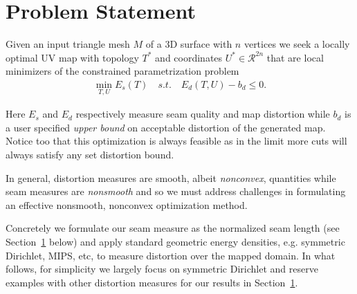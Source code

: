 
\section{Problem Statement}

Given an input triangle mesh $M$ of a 3D surface with $n$ vertices we seek a locally optimal UV map with topology $T^*$ and coordinates $U^* \in \mathcal{R}^{2n}$ that are local minimizers of the constrained parametrization problem
\begin{align}
	\min_{T,U} E_s(T) \quad s.t. \quad E_d(T,U) - b_d \leq 0.
	\label{eq:p1}
\end{align}


Here $E_s$ and $E_d$ respectively measure seam quality and map distortion while $b_d$ is a user specified \emph{upper bound} on acceptable distortion of the generated map. Notice too that this optimization is always feasible as in the limit more cuts will always satisfy any set distortion bound. 

In general, distortion measures are smooth, albeit \emph{nonconvex}, quantities while seam measures are \emph{nonsmooth} and so we must address challenges in formulating an effective nonsmooth, nonconvex optimization method. 

Concretely we formulate our seam measure as the normalized seam length (see Section\ \ref{} below) and apply standard geometric energy densities, e.g. symmetric Dirichlet, MIPS, etc, to measure distortion over the mapped domain. In what follows, for simplicity we largely focus on symmetric Dirichlet and reserve examples with other distortion measures for our results in Section\ \ref{}.



